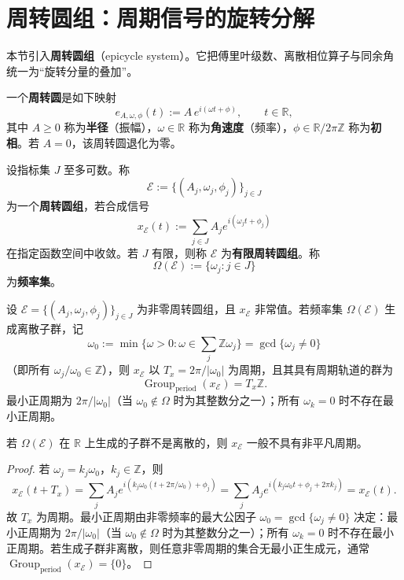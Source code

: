 \section{周转圆组：周期信号的旋转分解}\label{sec:epicycle_system}

本节引入\textbf{周转圆组}（epicycle system）。它把傅里叶级数、离散相位算子与同余角统一为“旋转分量的叠加”。

\begin{definition}[单个周转圆]\label{def:epicycle}
一个\textbf{周转圆}是如下映射
\[
e_{A,\omega,\phi}(t):=A\,e^{i(\omega t+\phi)},\qquad t\in\mathbb{R},
\]
其中 $A\ge0$ 称为\textbf{半径}（振幅），$\omega\in\mathbb{R}$ 称为\textbf{角速度}（频率），$\phi\in\mathbb{R}/2\pi\mathbb{Z}$ 称为\textbf{初相}。若 $A=0$，该周转圆退化为零。
\end{definition}

\begin{definition}[周转圆组]\label{def:epicycle_system}
设指标集 $J$ 至多可数。称
\[
\mathcal{E}:=\{(A_j,\omega_j,\phi_j)\}_{j\in J}
\]
为一个\textbf{周转圆组}，若合成信号
\[
x_{\mathcal{E}}(t):=\sum_{j\in J}A_j e^{i(\omega_j t+\phi_j)}
\]
在指定函数空间中收敛。若 $J$ 有限，则称 $\mathcal{E}$ 为\textbf{有限周转圆组}。称
\[
\Omega(\mathcal{E}):=\{\omega_j:j\in J\}
\]
为\textbf{频率集}。
\end{definition}

\begin{proposition}[周转圆组的具有周期轨道的群]\label{prop:epicycle_group_with_periodic_orbits}
设 $\mathcal{E}=\{(A_j,\omega_j,\phi_j)\}_{j\in J}$ 为非零周转圆组，且 $x_{\mathcal{E}}$ 非常值。若频率集 $\Omega(\mathcal{E})$ 生成离散子群，记
\[
\omega_0:=\min\{\omega>0:\omega\in\textstyle\sum_j\mathbb{Z}\omega_j\}=\gcd\{\omega_j\ne0\}
\]
（即所有 $\omega_j/\omega_0\in\mathbb{Z}$），则 $x_{\mathcal{E}}$ 以 $T_x=2\pi/\lvert\omega_0\rvert$ 为周期，且其具有周期轨道的群为
\[
\operatorname{Group}_{\mathrm{period}}(x_{\mathcal{E}})=T_x\mathbb{Z}.
\]
最小正周期为 $2\pi/\lvert\omega_0\rvert$（当 $\omega_0\notin\Omega$ 时为其整数分之一）；所有 $\omega_k=0$ 时不存在最小正周期。

若 $\Omega(\mathcal{E})$ 在 $\mathbb{R}$ 上生成的子群不是离散的，则 $x_{\mathcal{E}}$ 一般不具有非平凡周期。
\end{proposition}

\begin{proof}
若 $\omega_j=k_j\omega_0$，$k_j\in\mathbb{Z}$，则
\[
x_{\mathcal{E}}(t+T_x)=\sum_j A_j e^{i(k_j\omega_0(t+2\pi/\omega_0)+\phi_j)}
=\sum_j A_j e^{i(k_j\omega_0 t+\phi_j+2\pi k_j)}
=x_{\mathcal{E}}(t).
\]
故 $T_x$ 为周期。最小正周期由非零频率的最大公因子 $\omega_0=\gcd\{\omega_j\ne0\}$ 决定：最小正周期为 $2\pi/\lvert\omega_0\rvert$（当 $\omega_0\notin\Omega$ 时为其整数分之一）；所有 $\omega_k=0$ 时不存在最小正周期。若生成子群非离散，则任意非零周期的集合无最小正生成元，通常 $\operatorname{Group}_{\mathrm{period}}(x_{\mathcal{E}})=\{0\}$。
\end{proof}

